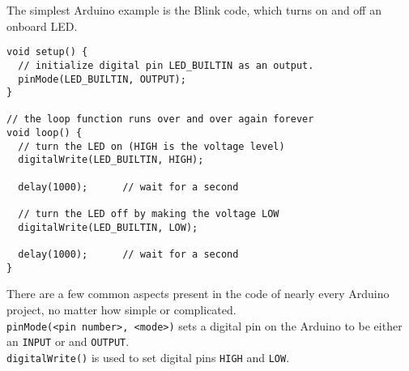 \documentclass[../TinyBot.tex]{subfiles}
\begin{document}
The simplest Arduino example is the Blink code, which turns on and off an onboard LED.

\begin{lstlisting}
void setup() {
  // initialize digital pin LED_BUILTIN as an output.
  pinMode(LED_BUILTIN, OUTPUT);
}

// the loop function runs over and over again forever
void loop() {
  // turn the LED on (HIGH is the voltage level)
  digitalWrite(LED_BUILTIN, HIGH); 

  delay(1000);      // wait for a second

  // turn the LED off by making the voltage LOW
  digitalWrite(LED_BUILTIN, LOW);  
  
  delay(1000);      // wait for a second
}
\end{lstlisting}


There are a few common aspects present in the code of nearly every Arduino project, no
matter how simple or complicated. \\

\lstinline[]!pinMode(<pin number>, <mode>)! sets a digital pin on the Arduino to be either
an \lstinline[]!INPUT! or and \lstinline[]!OUTPUT!. \\

\lstinline[]!digitalWrite()! is used to set digital pins \lstinline[]!HIGH! and \lstinline[]!LOW!.
\end{document}
